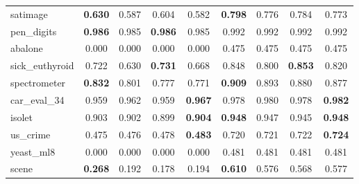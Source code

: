 \begin{figure}[ht]
\begin{tabular}{p{22mm}|*4{p{14mm}}|*4{p{14mm}}}
        satimage&\multicolumn{1}{c}{\textbf{0.630}}&\multicolumn{1}{c}{0.587}&\multicolumn{1}{c}{0.604}&\multicolumn{1}{c|}{0.582}&\multicolumn{1}{c}{\textbf{0.798}}&\multicolumn{1}{c}{0.776}&\multicolumn{1}{c}{0.784}&\multicolumn{1}{c}{0.773}\\
        pen\_digits&\multicolumn{1}{c}{\textbf{0.986}}&\multicolumn{1}{c}{0.985}&\multicolumn{1}{c}{\textbf{0.986}}&\multicolumn{1}{c|}{0.985}&\multicolumn{1}{c}{0.992}&\multicolumn{1}{c}{0.992}&\multicolumn{1}{c}{0.992}&\multicolumn{1}{c}{0.992}\\
        abalone&\multicolumn{1}{c}{0.000}&\multicolumn{1}{c}{0.000}&\multicolumn{1}{c}{0.000}&\multicolumn{1}{c|}{0.000}&\multicolumn{1}{c}{0.475}&\multicolumn{1}{c}{0.475}&\multicolumn{1}{c}{0.475}&\multicolumn{1}{c}{0.475}\\
        sick\_euthyroid&\multicolumn{1}{c}{0.722}&\multicolumn{1}{c}{0.630}&\multicolumn{1}{c}{\textbf{0.731}}&\multicolumn{1}{c|}{0.668}&\multicolumn{1}{c}{0.848}&\multicolumn{1}{c}{0.800}&\multicolumn{1}{c}{\textbf{0.853}}&\multicolumn{1}{c}{0.820}\\
        spectrometer&\multicolumn{1}{c}{\textbf{0.832}}&\multicolumn{1}{c}{0.801}&\multicolumn{1}{c}{0.777}&\multicolumn{1}{c|}{0.771}&\multicolumn{1}{c}{\textbf{0.909}}&\multicolumn{1}{c}{0.893}&\multicolumn{1}{c}{0.880}&\multicolumn{1}{c}{0.877}\\
        car\_eval\_34&\multicolumn{1}{c}{0.959}&\multicolumn{1}{c}{0.962}&\multicolumn{1}{c}{0.959}&\multicolumn{1}{c|}{\textbf{0.967}}&\multicolumn{1}{c}{0.978}&\multicolumn{1}{c}{0.980}&\multicolumn{1}{c}{0.978}&\multicolumn{1}{c}{\textbf{0.982}}\\
        isolet&\multicolumn{1}{c}{0.903}&\multicolumn{1}{c}{0.902}&\multicolumn{1}{c}{0.899}&\multicolumn{1}{c|}{\textbf{0.904}}&\multicolumn{1}{c}{\textbf{0.948}}&\multicolumn{1}{c}{0.947}&\multicolumn{1}{c}{0.945}&\multicolumn{1}{c}{\textbf{0.948}}\\
        us\_crime&\multicolumn{1}{c}{0.475}&\multicolumn{1}{c}{0.476}&\multicolumn{1}{c}{0.478}&\multicolumn{1}{c|}{\textbf{0.483}}&\multicolumn{1}{c}{0.720}&\multicolumn{1}{c}{0.721}&\multicolumn{1}{c}{0.722}&\multicolumn{1}{c}{\textbf{0.724}}\\
        yeast\_ml8&\multicolumn{1}{c}{0.000}&\multicolumn{1}{c}{0.000}&\multicolumn{1}{c}{0.000}&\multicolumn{1}{c|}{0.000}&\multicolumn{1}{c}{0.481}&\multicolumn{1}{c}{0.481}&\multicolumn{1}{c}{0.481}&\multicolumn{1}{c}{0.481}\\
        scene&\multicolumn{1}{c}{\textbf{0.268}}&\multicolumn{1}{c}{0.192}&\multicolumn{1}{c}{0.178}&\multicolumn{1}{c|}{0.194}&\multicolumn{1}{c}{\textbf{0.610}}&\multicolumn{1}{c}{0.576}&\multicolumn{1}{c}{0.568}&\multicolumn{1}{c}{0.577}\\

\end{tabular}
\end{figure}
